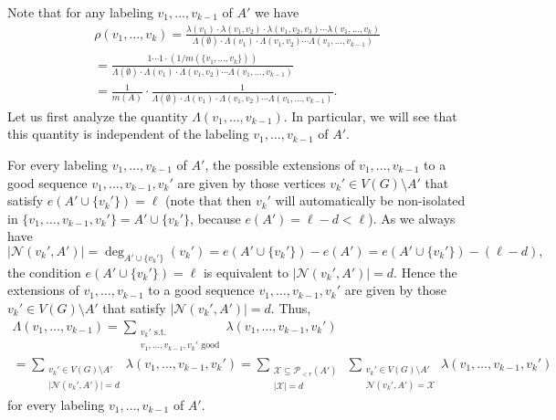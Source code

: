 Note that for any labeling $v_1,\dots,v_{k-1}$ of $A'$ we have
\begin{multline}\label{eq-w}
\rho(v_1,\dots,v_k)=\frac{\lambda(v_1)\cdot \lambda(v_1,v_2)\cdot \lambda(v_1,v_2,v_3)\dotsm \lambda(v_1,\dots,v_k)}{\Lambda(\emptyset)\cdot \Lambda(v_1)\cdot \Lambda(v_1, v_2)\dotsm \Lambda(v_1,\dots,v_{k-1})}\\
=\frac{1\dotsm 1\cdot (1/m(\lbrace v_1,\dots,v_{k}\rbrace))}{\Lambda(\emptyset)\cdot \Lambda(v_1)\cdot \Lambda(v_1, v_2)\dotsm \Lambda(v_1,\dots,v_{k-1})}\\
=\frac{1}{m(A)}\cdot \frac{1}{\Lambda(\emptyset)\cdot \Lambda(v_1)\cdot \Lambda(v_1, v_2)\dotsm \Lambda(v_1,\dots,v_{k-1})}.
\end{multline}
Let us first analyze the quantity $\Lambda(v_1,\dots,v_{k-1})$. In particular, we will see that this quantity is independent of the labeling $v_1,\dots,v_{k-1}$ of $A'$.

For every labeling $v_1,\dots,v_{k-1}$ of $A'$, the possible extensions of $v_1,\dots,v_{k-1}$ to a good sequence $v_1,\dots,v_{k-1}, v_k'$ are given by those vertices $v_k'\in V(G)\setminus A'$ that satisfy $e(A'\cup \lbrace v_k'\rbrace)=\ell$ (note that then $v_k'$ will automatically be non-isolated in $\lbrace v_1,\dots,v_{k-1}, v_k'\rbrace=A'\cup \lbrace v_k'\rbrace$, because $e(A')=\ell-d<\ell$). As we always have
\[\vert \mathcal{N}(v_k',A')\vert=\deg_{A'\cup  \lbrace v_k'\rbrace}(v_k')=e(A'\cup \lbrace v_k'\rbrace)-e(A')=e(A'\cup \lbrace v_k'\rbrace)-(\ell-d),\]
the condition $e(A'\cup \lbrace v_k'\rbrace)=\ell$ is equivalent to $\vert \mathcal{N}(v_k',A')\vert=d$. Hence the extensions of $v_1,\dots,v_{k-1}$ to a good sequence $v_1,\dots,v_{k-1}, v_k'$ are given by those $v_k'\in V(G)\setminus A'$  that satisfy $\vert \mathcal{N}(v_k',A')\vert=d$. Thus,
\begin{multline}\label{eq-last-Q}
\Lambda(v_1,\dots,v_{k-1})=\sum_{\substack{v_{k}'\text{ s.t. }\\v_1,\dots,v_{k-1},v_k' \text{ good}}}\lambda(v_1,\dots,v_{k-1}, v_k')\\
=\sum_{\substack{v_{k}'\in V(G)\setminus A'\\\vert \mathcal{N}(v_k',A')\vert=d}}\lambda(v_1,\dots,v_{k-1}, v_k')=\sum_{\substack{\mathcal{X}\subseteq \mathcal{P}\!_{<r}(A')\\ \vert \mathcal{X}\vert=d}}\ \sum_{\substack{v_{k}'\in V(G)\setminus A'\\ \mathcal{N}(v_k',A')=\mathcal{X}}}\lambda(v_1,\dots,v_{k-1}, v_k')
\end{multline}
for every labeling $v_1,\dots,v_{k-1}$ of $A'$.

